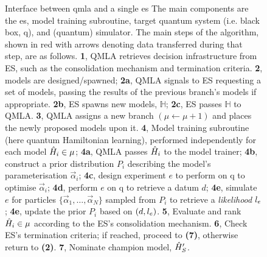 \begin{figure}
\begin{center}
\begin{tikzpicture}[node distance=2.25cm]
    \end{tikzpicture}
    \end{center}
    
    \caption[Interface between QMLA and a single exploration strategy]{
        Interface between \acrfull{qmla} and a single \acrfull{es}
        The main components are the \gls{es}, model training subroutine, target quantum system (i.e. black box, \gls{q}), 
        and (quantum) simulator. 
        The main steps of the algorithm, shown in red with arrows denoting data transferred during that step, are as follows.
        \textbf{1}, QMLA retrieves decision infrastructure from ES, such as the consolidation mechanism and termination criteria.
        \textbf{2}, models are designed/spawned; 
        \textbf{2a}, QMLA signals to ES requesting a set of models, passing the results of the previous branch's models if appropriate.
        \textbf{2b}, ES spawns new models, $\mathbb{H}$;
        \textbf{2c}, ES passes $\mathbb{H}$ to QMLA. 
        \textbf{3}, QMLA assigns a new branch $(\mu \gets \mu + 1)$ and places the newly proposed models upon it.
        \textbf{4}, Model training subroutine (here quantum Hamiltonian learning), performed independently for each model $\hi \in \mu$; 
        \textbf{4a}, QMLA passes $\hi$ to the model trainer; 
        \textbf{4b}, construct a prior distribution $P_i$ describing the model's parameterisation $\vec{\alpha}_i$;
        \textbf{4c}, design experiment $e$ to perform on \gls{q} to optimise $\vec{\alpha}_i$;
        \textbf{4d}, perform $e$ on \gls{q} to retrieve a datum $d$;
        \textbf{4e}, simulate $e$ for particles $\{ \vec{\alpha}_1, \dots , \vec{\alpha}_N \}$ 
            sampled from $P_i$ to retrieve a \emph{likelihood} $\lk_{e}$;
        \textbf{4e}, update the prior $P_i$ based on $(d, \lk_{e})$.
        \textbf{5}, Evaluate and rank $\hi \in \mu$ according to the ES's consolidation mechanism.
        \textbf{6}, Check ES's termination criteria; if reached, proceed to \textbf{(7)}, otherwise return to \textbf{(2)}.
        \textbf{7}, Nominate \gls{champion model}, $\hp_{S}$.        
    }
    \label{fig:qmla_flow}
\end{figure}

   